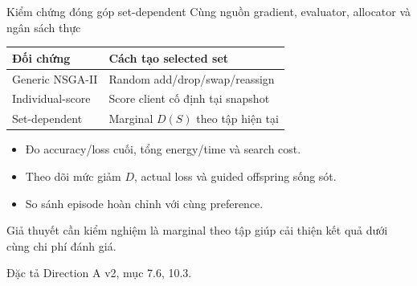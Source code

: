 \documentclass[10pt,aspectratio=43]{beamer}
\newcommand{\src}[1]{\par\vfill{\fontsize{6}{7.2}\selectfont\color{Muted}
 Đặc tả Direction A v2, mục #1.\par}}
\newcommand{\smallnote}[1]{\par{\footnotesize\color{Muted}#1\par}}
\begin{document}
\begin{frame}[t]{Kiểm chứng đóng góp set-dependent}
\relax
Cùng nguồn gradient, evaluator, allocator và ngân sách thực\par\medskip
{\small
\renewcommand{\arraystretch}{1.4}
\begin{tabularx}{.99\textwidth}{@{}lY@{}}
\toprule
\textbf{Đối chứng} & \textbf{Cách tạo selected set}\\
\midrule
Generic NSGA-II & Random add/drop/swap/reassign\\
Individual-score & Score client cố định tại snapshot\\
Set-dependent & Marginal $D(S)$ theo tập hiện tại\\
\bottomrule
\end{tabularx}\par
}
\medskip
\begin{itemize}
\item Đo accuracy/loss cuối, tổng energy/time và search cost.
\item Theo dõi mức giảm $D$, actual loss và guided offspring sống sót.
\item So sánh episode hoàn chỉnh với cùng preference.
\end{itemize}
\smallnote{Giả thuyết cần kiểm nghiệm là marginal theo tập giúp cải thiện kết quả dưới cùng chi phí đánh giá.}
\src{7.6, 10.3}
\end{frame}
\end{document}
